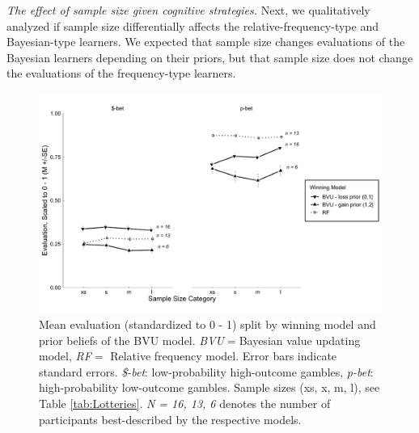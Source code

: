 \documentclass[a4paper, man, floatsintext]{apa6}
\begin{document}

\emph{The effect of sample size given cognitive strategies.} Next, we
qualitatively analyzed if sample size differentially affects the
relative-frequency-type and Bayesian-type learners. We expected that
sample size changes evaluations of the Bayesian learners depending on
their priors, but that sample size does not change the evaluations of
the frequency-type learners.

\begin{figure}

{\centering \includegraphics{../figures/qual1-1} 

}

\caption{Mean evaluation (standardized to 0 - 1) split by winning model and prior beliefs of the BVU model. \textit{BVU}$=$Bayesian value updating model, \textit{RF}$=$ Relative frequency model. Error bars indicate standard errors. \textit{\$-bet}: low-probability high-outcome gambles, \textit{p-bet}: high-probability low-outcome gambles. Sample sizes (xs, x, m, l), see Table \ref{tab:Lotteries}. \textit{N = 16, 13, 6} denotes the number of participants best-described by the respective models.}\label{fig:qual1}
\end{figure}
\end{document}
